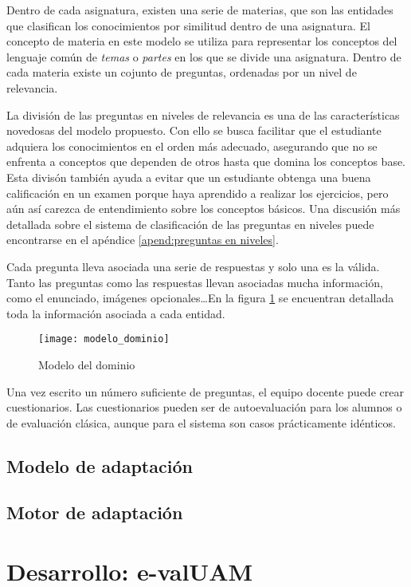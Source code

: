 Dentro de cada asignatura, existen una serie de materias, que son las entidades que clasifican los conocimientos por similitud dentro de una asignatura. El concepto de materia en este modelo se utiliza para representar los conceptos del lenguaje común de \emph{temas} o \emph{partes} en los que se divide una asignatura. Dentro de cada materia existe un cojunto de preguntas, ordenadas por un nivel de relevancia.

La división de las preguntas en niveles de relevancia es una de las características novedosas del modelo propuesto. Con ello se busca facilitar que el estudiante adquiera los conocimientos en el orden más adecuado, asegurando que no se enfrenta a conceptos que dependen de otros hasta que domina los conceptos base. Esta divisón también ayuda a evitar que un estudiante obtenga una buena calificación en un examen porque haya aprendido a realizar los ejercicios, pero aún así carezca de entendimiento sobre los conceptos básicos. Una discusión más detallada sobre el sistema de clasificación de las preguntas en niveles puede encontrarse en el apéndice \ref{apend:preguntas en niveles}.

Cada pregunta lleva asociada una serie de respuestas y solo una es la válida. Tanto las preguntas como las respuestas llevan asociadas mucha información, como el enunciado, imágenes opcionales\ldots En la figura \ref{fig:modelo del dominio} se encuentran detallada toda la información asociada a cada entidad. 

\begin{figure}[htp!]
	\centering
	\texttt{[image: modelo\_dominio]}
	\caption{Modelo del dominio}
	\label{fig:modelo del dominio}
\end{figure}

Una vez escrito un número suficiente de preguntas, el equipo docente puede crear cuestionarios. Las cuestionarios pueden ser de autoevaluación para los alumnos o de evaluación clásica, aunque para el sistema son casos prácticamente idénticos.


\subsection{Modelo de adaptación}




\subsection{Motor de adaptación}






\section{Desarrollo: e-valUAM\label{sec:desarrollo}}

